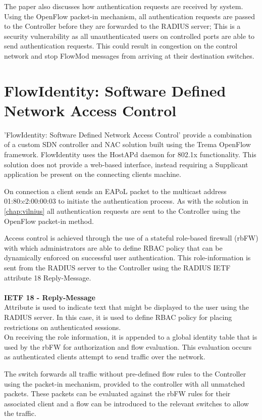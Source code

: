 The paper also discusses how authentication requests are received by system. Using the OpenFlow packet-in mechanism, all authentication requests are passed to the Controller before they are forwarded to the RADIUS server; This is a security vulnerability as all unauthenticated users on controlled ports are able to send authentication requests. This could result in congestion on the control network and stop FlowMod messages from arriving at their destination switches.

\section{FlowIdentity: Software Defined Network Access Control}
\cite{flow_identity}
'FlowIdentity: Software Defined Network Access Control' provide a combination of a custom SDN controller and NAC solution built using the Trema OpenFlow framework. FlowIdentity uses the HostAPd daemon for 802.1x functionality. This solution does not provide a web-based interface, instead requiring a Supplicant application be present on the connecting clients machine. 

On connection a client sends an EAPoL packet to the multicast address 01:80:c2:00:00:03 to initiate the authentication process. As with the solution in \ref{chap:vilnius} all authentication requests are sent to the Controller using the OpenFlow packet-in method.

Access control is achieved through the use of a stateful role-based firewall (rbFW) with which administrators are able to define RBAC policy that can be dynamically enforced on successful user authentication. This role-information is sent from the RADIUS server to the Controller using the RADIUS IETF attribute 18 Reply-Message.\\
\\
\textbf{IETF 18 - Reply-Message}\\
Attribute is used to indicate text that might be displayed to the user using the RADIUS server. In this case, it is used to define RBAC policy for placing restrictions on authenticated sessions.
\\
On receiving the role information, it is appended to a global identity table that is used by the rbFW for authorization and flow evaluation. This evaluation occurs as authenticated clients attempt to send traffic over the network. 

The switch forwards all traffic without pre-defined flow rules to the Controller using the packet-in mechanism, provided to the controller with all unmatched packets. These packets can be evaluated against the rbFW rules for their associated client and a flow can be introduced to the relevant switches to allow the traffic.

